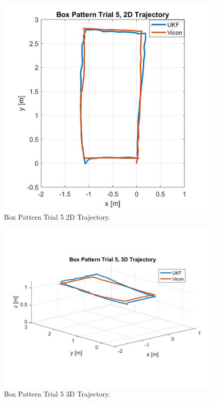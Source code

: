 \begin{figure}[p]
  \centering
    \includegraphics[height=0.6\textwidth]{box5_2d}
  \caption[Box Pattern Trial 5 2D Trajectory]{Box Pattern Trial 5 2D Trajectory.}
  \label{fig:box5_2d}
\end{figure}
\begin{figure}[p]
  \centering
    \includegraphics[height=0.7\textwidth]{box5_3d}
  \caption[Box Pattern Trial 5 3D Trajectory]{Box Pattern Trial 5 3D Trajectory.}
  \label{fig:box5_3d}
\end{figure}
\clearpage

